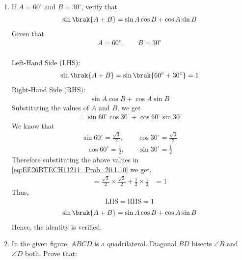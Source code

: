 \begin{enumerate}[label=\thesubsection.\arabic*, ref=\thesubsection.\theenumi]
\item
If $A=60^\circ$ and $B=30^\circ$, verify that
\begin{align}
\sin\brak{A+B}=\sin A\cos B+\cos A\sin B
\end{align}
\solution
Given that
\begin{align}
A=60^\circ,\qquad B=30^\circ
\end{align}
\\Left-Hand Side (LHS):
\begin{align}
\sin\brak{A+B}=\sin\brak{60^\circ+30^\circ}=1
\end{align}
Right-Hand Side (RHS):
\begin{align}
\sin A\cos B+\cos A\sin B
\end{align}
Substituting the values of $A$ and $B$, we get
\begin{align}
=\sin 60^\circ\cos 30^\circ+\cos 60^\circ\sin 30^\circ \label{eq:EE26BTECH11211_Prob_20.1.10}
\end{align}
We know that
\begin{align}
\sin 60^\circ=\frac{\sqrt{3}}{2},
\qquad
\cos 30^\circ=\frac{\sqrt{3}}{2}
\end{align}
\begin{align}
\cos 60^\circ=\frac{1}{2},
\qquad
\sin 30^\circ=\frac{1}{2}
\end{align}
Therefore substituting the above values in \eqref{eq:EE26BTECH11211_Prob_20.1.10} we get,
\begin{align}
=\frac{\sqrt{3}}{2}\times\frac{\sqrt{3}}{2}
+\frac{1}{2}\times\frac{1}{2}&=1
\end{align}
Thus,
\begin{align}
\text{LHS}=\text{RHS}=1
\end{align}
\begin{align}
\sin\brak{A+B}=\sin A\cos B+\cos A\sin B
\end{align}
Hence, the identity is verified.


\item
In the given figure, $ABCD$ is a quadrilateral. Diagonal $BD$
bisects $\angle B$ and $\angle D$ both. Prove that:

\begin{figure}[ht]
\centering

\end{figure}
\end{enumerate}
